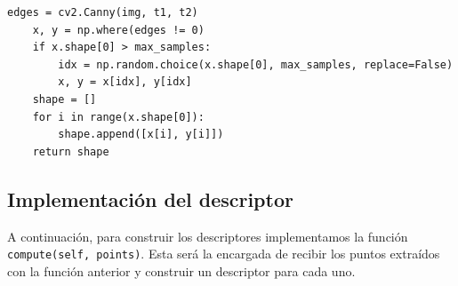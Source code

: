\documentclass[size=a4, parskip=half, titlepage=false, toc=flat, toc=bib, 12pt]{scrartcl}
\begin{document}
\begin{verbatim}
edges = cv2.Canny(img, t1, t2)
    x, y = np.where(edges != 0)
    if x.shape[0] > max_samples:
        idx = np.random.choice(x.shape[0], max_samples, replace=False)
        x, y = x[idx], y[idx]
    shape = []
    for i in range(x.shape[0]):
        shape.append([x[i], y[i]])
    return shape
\end{verbatim}

\subsection{Implementación del descriptor}%
\label{sub:implementación_del_descriptor}

A continuación, para construir los descriptores implementamos la función \texttt{compute(self, points)}. Esta será la encargada de recibir los puntos extraídos con la función anterior y construir un descriptor para cada uno.
\end{document}
